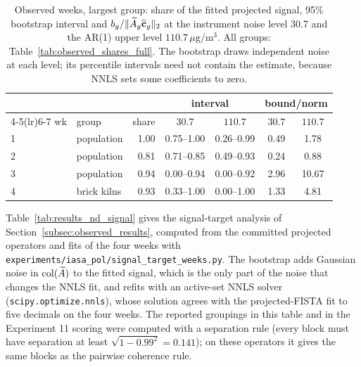\begin{table}[t]
\centering
\footnotesize
\setlength{\tabcolsep}{2.5pt}
\caption{Observed weeks, largest group: share of the fitted projected signal, 95\%
bootstrap interval and \(b_g/\|\widetilde A_g\widehat{\mathbf c}_g\|_2\) at the instrument noise
level \(30.7\) and the AR(1) upper level \(110.7\,\mu\mathrm g/\mathrm m^3\).  All groups:
Table~\ref{tab:observed_shares_full}.  The bootstrap draws independent noise at each
level; its percentile intervals need not contain the estimate, because NNLS sets some
coefficients to zero.}
\label{tab:observed_shares}
\vspace{3pt}
\begin{tabular}{llrcccc}
\toprule
 & & & \multicolumn{2}{c}{interval} & \multicolumn{2}{c}{bound/norm} \\
\cmidrule(lr){4-5}\cmidrule(lr){6-7}
wk & group & share & \(30.7\) & \(110.7\) & \(30.7\) & \(110.7\) \\
\midrule
1 & population & 1.00 & 0.75--1.00 & 0.26--0.99 & 0.49 & 1.78 \\
2 & population & 0.81 & 0.71--0.85 & 0.49--0.93 & 0.24 & 0.88 \\
3 & population & 0.94 & 0.00--0.94 & 0.00--0.92 & 2.96 & 10.67 \\
4 & brick kilns & 0.93 & 0.33--1.00 & 0.00--1.00 & 1.33 & 4.81 \\
\bottomrule
\end{tabular}
\end{table}

Table~\ref{tab:results_nd_signal} gives the signal-target analysis of Section~\ref{subsec:observed_results}, computed from the committed projected operators and fits of the four weeks with \texttt{experiments/iasa\_pol/signal\_target\_weeks.py}.  The bootstrap adds Gaussian noise in \(\operatorname{col}(\widetilde A)\) to the fitted signal, which is the only part of the noise that changes the NNLS fit, and refits with an active-set NNLS solver (\texttt{scipy.optimize.nnls}), whose solution agrees with the projected-FISTA fit to five decimals on the four weeks.  The reported groupings in this table and in the Experiment 11 scoring were computed with a separation rule (every block must have separation at least \(\sqrt{1-0.99^2}=0.141\)); on these operators it gives the same blocks as the pairwise coherence rule.

